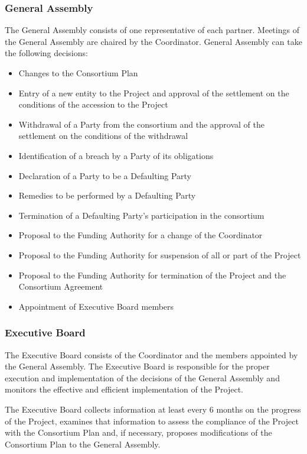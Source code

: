 \documentclass[a4paper,11pt]{article}
\begin{document}
\subsubsection{General Assembly}

The General Assembly consists of one representative of each partner. Meetings of the General Assembly are chaired by the Coordinator. General Assembly can take the following decisions:

\begin{itemize}
\item Changes to the Consortium Plan
\item Entry of a new entity to the Project and approval of the settlement on the conditions of the accession to the Project
\item Withdrawal of a Party from the consortium and the approval of the settlement on the conditions of the withdrawal
\item Identification of a breach by a Party of its obligations
\item Declaration of a Party to be a Defaulting Party
\item Remedies to be performed by a Defaulting Party
\item Termination of a Defaulting Party’s participation in the consortium
\item Proposal to the Funding Authority for a change of the Coordinator
\item Proposal to the Funding Authority for suspension of all or part of the Project
\item Proposal to the Funding Authority for termination of the Project and the Consortium Agreement
\item Appointment of Executive Board members
\end{itemize}


\subsubsection{Executive Board}

The Executive Board consists of the Coordinator and the members appointed by the General Assembly. The Executive Board is responsible for the proper execution and implementation of the decisions of the General Assembly and monitors the effective and efficient implementation of the Project.

The Executive Board collects information at least every 6 months on the progress of the Project, examines that information to assess the compliance of the Project with the Consortium Plan and, if necessary, proposes modifications of the Consortium Plan to the General Assembly. 
\end{document}
